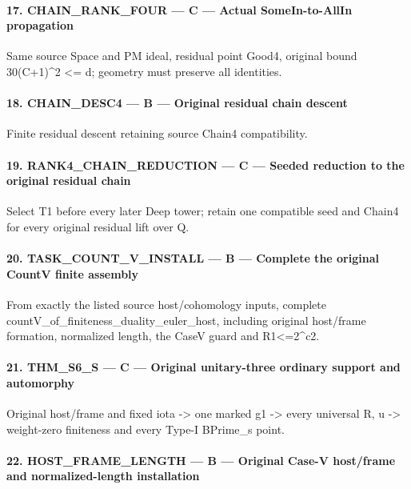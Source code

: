\documentclass[11pt,a4paper]{article}
\numberwithin{equation}{section}
\theoremstyle{remark}\newtheorem{remark}[theorem]{Remark}
\begin{document}
\paragraph{17. CHAIN\_\allowbreak{}RANK\_\allowbreak{}FOUR — C — Actual SomeIn-to-AllIn propagation}

Same source Space and PM ideal, residual point Good4, original bound 30(C+1)\textasciicircum{}2 <= d; geometry must preserve all identities.


\paragraph{18. CHAIN\_\allowbreak{}DESC4 — B — Original residual chain descent}

Finite residual descent retaining source Chain4 compatibility.


\paragraph{19. RANK4\_\allowbreak{}CHAIN\_\allowbreak{}REDUCTION — C — Seeded reduction to the original residual chain}

Select T1 before every later Deep tower; retain one compatible seed and Chain4 for every original residual lift over Q.


\paragraph{20. TASK\_\allowbreak{}COUNT\_\allowbreak{}V\_\allowbreak{}INSTALL — B — Complete the original CountV finite assembly}

From exactly the listed source host/\allowbreak{}cohomology inputs, complete countV\_\allowbreak{}of\_\allowbreak{}finiteness\_\allowbreak{}duality\_\allowbreak{}euler\_\allowbreak{}host, including original host/\allowbreak{}frame formation, normalized length, the CaseV guard and R1<=2\textasciicircum{}c2.


\paragraph{21. THM\_\allowbreak{}S6\_\allowbreak{}S — C — Original unitary-three ordinary support and automorphy}

Original host/\allowbreak{}frame and fixed iota -> one marked g1 -> every universal R,\allowbreak{} u -> weight-zero finiteness and every Type-I BPrime\_\allowbreak{}s point.


\paragraph{22. HOST\_\allowbreak{}FRAME\_\allowbreak{}LENGTH — B — Original Case-V host/\allowbreak{}frame and normalized-length installation}
\end{document}
